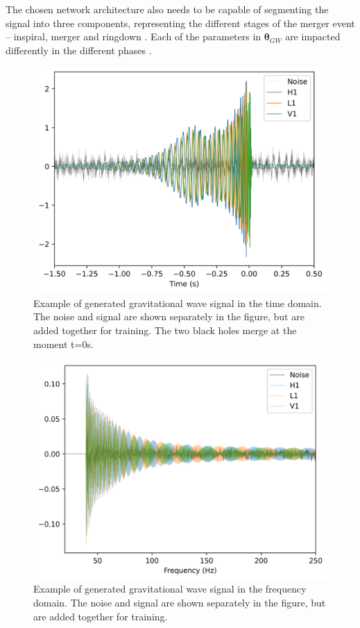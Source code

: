The chosen network architecture also needs to be capable of segmenting the signal into three components, representing the different stages of the merger event -- inspiral, merger and ringdown \cite{Pan_GW_2014}. Each of the parameters in $\boldsymbol{\theta}_{GW}$ are impacted differently in the different phases \cite{bhardwaj2023peregrine}.

\begin{figure}
  \centering
  \includegraphics[width=1\linewidth]{media/images/obs_time_domain.png}
  \caption{Example of generated gravitational wave signal in the time domain. The noise and signal are shown separately in the figure, but are added together for training. The two black holes merge at the moment t=0s. }
  \label{fig:obs_time_domain}
\end{figure}

\begin{figure}
  \centering
  \includegraphics[width=1\linewidth]{media/images/obs_frequency_domain.png}
  \caption{Example of generated gravitational wave signal in the frequency domain. The noise and signal are shown separately in the figure, but are added together for training.}
  \label{fig:obs_freq_domain}
\end{figure}

